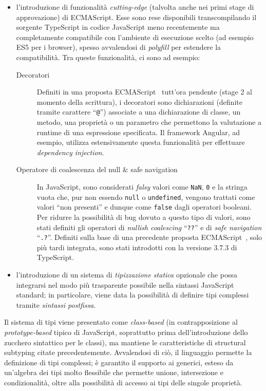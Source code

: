       \begin{itemize}
        \item
          l'introduzione di funzionalità \emph{cutting-edge} (talvolta anche nei primi stage di approvazione) di ECMAScript.
          Esse sono rese disponibili transcompilando il sorgente TypeScript in codice JavaScript meno recentemente ma completamente compatibile con l'ambiente di esecuzione scelto
          (ad esempio ES5 per i browser), spesso avvalendosi di \emph{polyfill} per estendere la compatibilità.
          Tra queste funzionalità, ci sono ad esempio:
          \begin{description}
            \item[Decoratori]
              Definiti in una proposta ECMAScript~\cite{decorators} tutt'ora pendente (stage 2 al momento della scrittura),
              i decoratori sono dichiarazioni (definite tramite carattere ``\texttt{@}'') associate a una dichiarazione di classe, un metodo, una proprietà o un parametro che permettono la valutazione a runtime di una espressione specificata.
              Il framework Angular, ad esempio, utilizza estensivamente questa funzionalità per effettuare \emph{dependency injection}.

            \item[Operatore di coalescenza del null \& safe navigation]
              In JavaScript, sono considerati \emph{falsy} valori come \texttt{NaN}, \texttt{0} e la stringa vuota che, pur non essendo \texttt{null} o \texttt{undefined},
              vengono trattati come valori ``non presenti'' e dunque come \texttt{false} dagli operatori booleani.
              Per ridurre la possibilità di bug dovuto a questo tipo di valori, sono stati definiti gli operatori di \emph{nullish coalescing} ``\texttt{??}'' e di \emph{safe navigation} ``\texttt{.?}''.
              Definiti sulla base di una precedente proposta ECMAScript~\cite{optional}, solo più tardi integrata, sono stati introdotti con la versione 3.7.3 di TypeScript.
          \end{description}
        \item
          l'introduzione di un sistema di \emph{tipizzazione statica} opzionale che possa integrarsi nel modo più trasparente possibile nella sintassi JavaScript standard;
          in particolare, viene data la possibilità di definire tipi complessi tramite \emph{sintassi postfissa}.
      \end{itemize}

      Il sistema di tipi viene presentato come \emph{class-based} (in contrapposizione al \emph{prototype-based} tipico di JavaScript, soprattutto prima dell'introduzione dello zucchero sintattico per le classi), ma mantiene le caratteristiche di structural subtyping citate precedentemente.
      Avvalendosi di ciò, il linguaggio permette la definizione di tipi complessi;
      è garantito il supporto ai generici, esteso da un'algebra dei tipi molto flessibile che permette unione, intersezione e condizionalità, oltre alla possibilità di accesso ai tipi delle singole proprietà.

